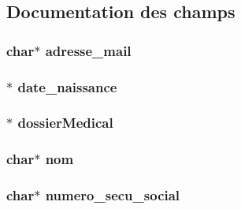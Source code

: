 \subsection{Documentation des champs}
\hypertarget{struct_patient_aefa944e4b78fb9e14c4f6e49605bba2c}{
\subsubsection[{adresse\-\_\-mail}]{\setlength{\rightskip}{0pt plus 5cm}char$\ast$ adresse\-\_\-mail}}\label{struct_patient_aefa944e4b78fb9e14c4f6e49605bba2c}
\hypertarget{struct_patient_a1ce5c592705142193b097a1bed2794e6}{
\subsubsection[{date\-\_\-naissance}]{$\ast$ date\-\_\-naissance}}\label{struct_patient_a1ce5c592705142193b097a1bed2794e6}
\hypertarget{struct_patient_a7b81f4ba7de896fa37673d677977cedf}{
\subsubsection[{dossier\-Medical}]{$\ast$ dossier\-Medical}}\label{struct_patient_a7b81f4ba7de896fa37673d677977cedf}
\hypertarget{struct_patient_abe308d273ff51ad86ff02ef3ba3b6f0e}{
\subsubsection[{nom}]{\setlength{\rightskip}{0pt plus 5cm}char$\ast$ nom}}\label{struct_patient_abe308d273ff51ad86ff02ef3ba3b6f0e}
\hypertarget{struct_patient_a49bbab73f86aafe9ee3ef4b862946698}{
\subsubsection[{numero\-\_\-secu\-\_\-social}]{\setlength{\rightskip}{0pt plus 5cm}char$\ast$ numero\-\_\-secu\-\_\-social}}\label{struct_patient_a49bbab73f86aafe9ee3ef4b862946698}
